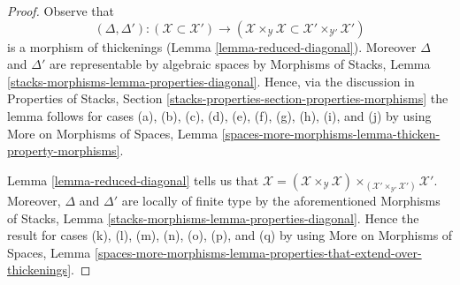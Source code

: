 \documentclass[10pt,a4paper]{amsart}
\theoremstyle{plain}
\theoremstyle{definition}
\theoremstyle{remark}
\numberwithin{equation}{subsection}
\begin{document}
\begin{proof}
Observe that
$$
(\Delta, \Delta') :
(\mathcal{X} \subset \mathcal{X}')
\longrightarrow
(\mathcal{X} \times_\mathcal{Y} \mathcal{X} \subset
\mathcal{X}' \times_{\mathcal{Y}'} \mathcal{X}')
$$
is a morphism of thickenings (Lemma \ref{lemma-reduced-diagonal}).
Moreover $\Delta$ and $\Delta'$ are
representable by algebraic spaces by
Morphisms of Stacks, Lemma \ref{stacks-morphisms-lemma-properties-diagonal}.
Hence, via the discussion in
Properties of Stacks, Section
\ref{stacks-properties-section-properties-morphisms}
the lemma follows for cases (a), (b), (c), (d),
(e), (f), (g), (h), (i), and (j) by using
More on Morphisms of Spaces, Lemma
\ref{spaces-more-morphisms-lemma-thicken-property-morphisms}.

\medskip\noindent
Lemma \ref{lemma-reduced-diagonal} tells us that
$\mathcal{X} = (\mathcal{X} \times_\mathcal{Y} \mathcal{X})
\times_{(\mathcal{X}' \times_{\mathcal{Y}'} \mathcal{X}')} \mathcal{X}'$.
Moreover, $\Delta$ and $\Delta'$ are locally of finite type by
the aforementioned
Morphisms of Stacks, Lemma \ref{stacks-morphisms-lemma-properties-diagonal}.
Hence the result for cases (k), (l), (m), (n), (o), (p), and (q) by using
More on Morphisms of Spaces, Lemma
\ref{spaces-more-morphisms-lemma-properties-that-extend-over-thickenings}.
\end{proof}
\end{document}
